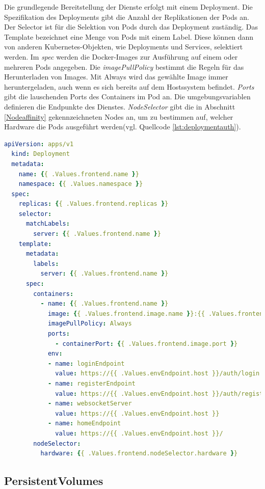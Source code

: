 Die grundlegende Bereitstellung der Dienste erfolgt mit einem Deployment.
Die Spezifikation des Deployments gibt die Anzahl der Replikationen der Pods an.
Der Selector ist für die Selektion von Pods durch das Deployment zuständig.
Das Template bezeichnet eine Menge von Pods mit einem Label.
Diese können dann von anderen Kubernetes-Objekten, wie Deployments und Services, selektiert werden.
Im \textit{spec} werden die Docker-Images zur Ausführung auf einem oder mehreren Pods angegeben.
Die \textit{imagePullPolicy} bestimmt die Regeln für das Herunterladen von Images.
Mit Always wird das gewählte Image immer heruntergeladen, auch wenn es sich bereits auf dem Hostssystem befindet.
\textit{Ports} gibt die lauschenden Ports des Containers im Pod an.
Die umgebungsvariablen definieren die Endpunkte des Dienstes.
\textit{NodeSelector} gibt die in Abschnitt \ref{Nodeaffinity} gekennzeichneten Nodes an, um zu bestimmen auf, welcher Hardware die Pods ausgeführt werden(vgl. Quellcode \ref{lst:deploymentauth}).


\begin{lstlisting}[caption={frontend-deployment.yaml },captionpos=b,label={lst:deploymentauth},language=yaml]
  apiVersion: apps/v1
  kind: Deployment
  metadata:
    name: {{ .Values.frontend.name }}
    namespace: {{ .Values.namespace }}
  spec:
    replicas: {{ .Values.frontend.replicas }}
    selector:
      matchLabels:
        server: {{ .Values.frontend.name }}
    template:
      metadata:
        labels:
          server: {{ .Values.frontend.name }}
      spec:
        containers:
          - name: {{ .Values.frontend.name }}
            image: {{ .Values.frontend.image.name }}:{{ .Values.frontend.image.tag }}
            imagePullPolicy: Always
            ports:
              - containerPort: {{ .Values.frontend.image.port }}
            env:
            - name: loginEndpoint
              value: https://{{ .Values.envEndpoint.host }}/auth/login
            - name: registerEndpoint
              value: https://{{ .Values.envEndpoint.host }}/auth/register
            - name: websocketServer
              value: https://{{ .Values.envEndpoint.host }}
            - name: homeEndpoint
              value: https://{{ .Values.envEndpoint.host }}/
        nodeSelector:
          hardware: {{ .Values.frontend.nodeSelector.hardware }}

\end{lstlisting}



\subsection{PersistentVolumes}

